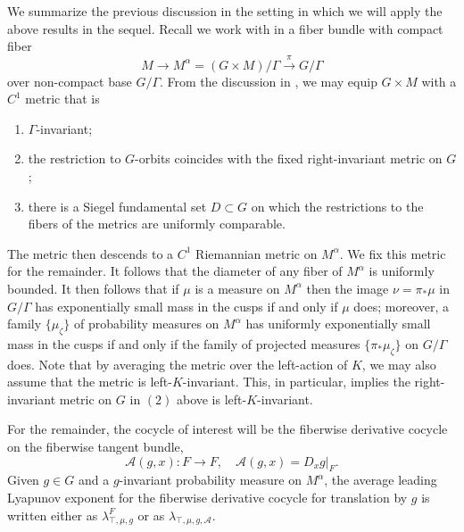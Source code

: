 \documentclass[10pt,reqno]{amsart}
\theoremstyle{Theorem}
\theoremstyle{definition}
\theoremstyle{remark}
\newcommand{\restrict}[2]{{#1}{|_{{ #2}}}}
\def\calA{\mathcal A}
\def\calE{\mathcal E}
\def\red{\color{red}}
\def\blue{}
\begin{document}
We summarize the  previous  discussion in the setting in which we will apply the above results in the sequel.   Recall we work with in a    fiber bundle with compact fiber $$M \rightarrow M^{\alpha}=(G \times M)/\Gamma \xrightarrow{\pi} G/\Gamma$$
 over non-compact
base $G/\Gamma$.
From  the discussion in  \cite[Section  2.1]{AWBFRHZW-latticemeasure}, we may equip $G\times M$ with a $C^1$ metric that is \begin{enumerate}
\item  $\Gamma$-invariant;
\item the restriction to $G$-orbits coincides with the fixed right-invariant metric on $G$;
\item there is a Siegel fundamental set $D\subset G$ on which the restrictions to the fibers of the metrics are uniformly comparable.
\end{enumerate}
The metric then descends to a $C^1$ Riemannian metric on $M^\alpha$.  We fix this metric for the remainder.  It follows that the diameter of any fiber of $M^\alpha$ is uniformly bounded.
It then follows that if $\mu$ is a measure on $M^\alpha$ then the image $\nu= \pi_* \mu$ in $G/\Gamma$ has  exponentially small mass in the cusps if and only if $\mu$ does; {\blue moreover, a family $\{\mu_\zeta\}$ of probability measures on $M^\alpha$ has  uniformly exponentially small mass in the cusps if and only if the family of projected  measures  $\{\pi_*\mu_\zeta\}$ on $G/\Gamma$ does.}
 Note that by averaging the metric over the left-action of $K$, we may also assume that the metric is left-$K$-invariant.  This, in particular, implies the right-invariant metric on $G$ in $(2)$ above is left-$K$-invariant.

{\blue For the remainder, the cocycle of interest will be the fiberwise derivative cocycle on the fiberwise tangent bundle, $$\calA(g,x)\colon F\to F,\quad \calA(g,x)= \restrict{D_xg}{F}.$$
Given  $g\in G$ and a $g$-invariant probability measure on $M^\alpha$,
the average leading   Lyapunov exponent for the fiberwise derivative cocycle for translation by $g$  is written either as $\lambda^F_{\top,\mu,g}$
or as  $\lambda_{\top,\mu,g, \calA}$.}


\end{document}
